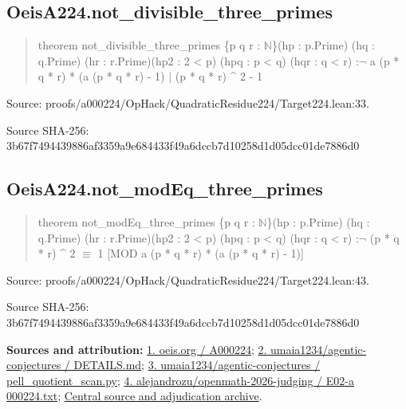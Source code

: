 \documentclass[11pt,a4paper]{article}
\begin{document}
\begin{samepage}
\subsection{OeisA224.not\_divisible\_three\_primes}
\begin{quote}\small\ttfamily theorem not\_divisible\_three\_primes \{p q r : \ensuremath{\mathbb{N}}\}\newline     (hp : p.Prime) (hq : q.Prime) (hr : r.Prime)\newline     (hp2 : 2 < p) (hpq : p < q) (hqr : q < r) :\newline     \ensuremath{\neg} a (p * q * r) * (a (p * q * r) - 1) \ensuremath{\mid} (p * q * r) \textasciicircum{} 2 - 1\end{quote}
{\small Source: proofs/a000224/OpHack/QuadraticResidue224/Target224.lean:33.\par}

{\small Source SHA-256: 3b67f7494439886af3359a9e684433f49a6dccb7d10258d1d05dcc01de7886d0\par}

\end{samepage}
\begin{samepage}
\subsection{OeisA224.not\_modEq\_three\_primes}
\begin{quote}\small\ttfamily theorem not\_modEq\_three\_primes \{p q r : \ensuremath{\mathbb{N}}\}\newline     (hp : p.Prime) (hq : q.Prime) (hr : r.Prime)\newline     (hp2 : 2 < p) (hpq : p < q) (hqr : q < r) :\newline     \ensuremath{\neg} (p * q * r) \textasciicircum{} 2 \ensuremath{\equiv} 1 [MOD a (p * q * r) * (a (p * q * r) - 1)]\end{quote}
{\small Source: proofs/a000224/OpHack/QuadraticResidue224/Target224.lean:43.\par}

{\small Source SHA-256: 3b67f7494439886af3359a9e684433f49a6dccb7d10258d1d05dcc01de7886d0\par}

{\small\textbf{Sources and attribution:} \href{https://oeis.org/A000224}{1. oeis.org / A000224}; \href{https://github.com/umaia1234/agentic-conjectures/blob/96ea0039d9dc3a1940b9d5ec1cbe616ed58d1da2/problems/oeis-a000224/DETAILS.md}{2. umaia1234/agentic-conjectures / DETAILS.md}; \href{https://github.com/umaia1234/agentic-conjectures/blob/96ea0039d9dc3a1940b9d5ec1cbe616ed58d1da2/problems/oeis-a000224/pell_quotient_scan.py}{3. umaia1234/agentic-conjectures / pell\_quotient\_scan.py}; \href{https://github.com/alejandrozu/openmath-2026-judging/blob/d0ed487f487fa7ec814ff705ab55249983fe8707/OpenMath-Judging/review/entries/E02-a000224.txt}{4. alejandrozu/openmath-2026-judging / E02-a 000224.txt}; \href{https://github.com/alejandrozu/openmath-2026-judging}{Central source and adjudication archive}.\par}

\end{samepage}
\end{document}
